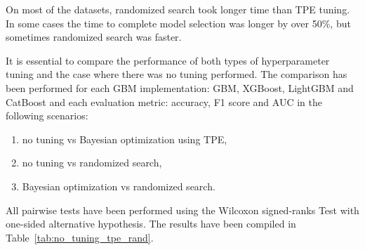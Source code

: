 \documentclass[magisterska, english]{pwr_wmat_praca_dyplomowa}
\theoremstyle{plain}
\numberwithin{theorem}{chapter}
\theoremstyle{definition}
\numberwithin{theorem}{chapter}
\begin{document}
On most of the datasets, randomized search took longer time than TPE tuning. In some cases the time to complete model selection was longer by over 50\%, but sometimes randomized search was faster.

It is essential to compare the performance of both types of hyperparameter tuning and the case where there was no tuning performed. The comparison has been performed for each GBM implementation: GBM, XGBoost, LightGBM and CatBoost and each evaluation metric: accuracy, F1 score and AUC in the following scenarios:

\begin{enumerate}
    \item no tuning vs Bayesian optimization using TPE,
    \item no tuning vs randomized search,
    \item Bayesian optimization vs randomized search.
\end{enumerate}

All pairwise tests have been performed using the Wilcoxon signed-ranks Test with one-sided alternative hypothesis. The results have been compiled in Table~\ref{tab:no_tuning_tpe_rand}.
\end{document}
